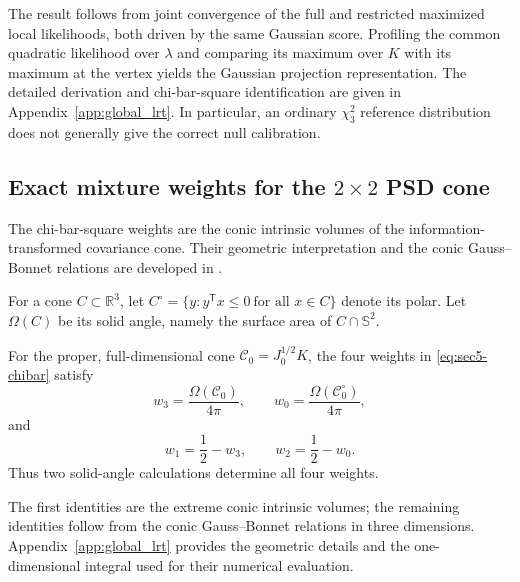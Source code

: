 The result follows from joint convergence of the full and restricted
maximized local likelihoods, both driven by the same Gaussian score.
Profiling the common quadratic likelihood over $\lambda$ and
comparing its maximum over $K$ with its maximum at the vertex yields
the Gaussian projection representation. The detailed derivation and
chi-bar-square identification are given in
Appendix~\ref{app:global_lrt}. In particular, an ordinary
$\chi_3^2$ reference distribution does not generally give the
correct null calibration.


\subsection{Exact mixture weights for the
$2\times2$ PSD cone}
\label{subsec:global_exact_weights}

The chi-bar-square weights are the conic intrinsic
volumes of the information-transformed covariance
cone. Their geometric interpretation and the
conic Gauss--Bonnet relations are developed in
\citet{amelunxen2014}.

For a cone $C\subset\mathbb R^3$, let
$C^\circ=\{y:y^{\mathsf T}x\leq0
\ \text{for all }x\in C\}$
denote its polar. Let $\Omega(C)$ be its solid
angle, namely the surface area of
$C\cap\mathbb S^2$.


\begin{proposition}\label{prop:sec5-solid-angle-weights}
For the proper, full-dimensional cone
$\mathcal C_0=J_0^{1/2}K$, the four weights in
\eqref{eq:sec5-chibar} satisfy
\begin{equation}\label{eq:sec5-extreme-weights}
 w_3=\frac{\Omega(\mathcal C_0)}{4\pi},
 \qquad
 w_0=\frac{\Omega(\mathcal C_0^\circ)}{4\pi},
\end{equation}
and
\begin{equation}\label{eq:sec5-middle-weights}
 w_1=\frac12-w_3,
 \qquad
 w_2=\frac12-w_0.
\end{equation}
Thus two solid-angle calculations determine all four weights.
\end{proposition}

The first identities are the extreme conic intrinsic volumes; the
remaining identities follow from the conic Gauss--Bonnet relations in
three dimensions. Appendix~\ref{app:global_lrt} provides the geometric details and the
one-dimensional integral used for their numerical evaluation.

